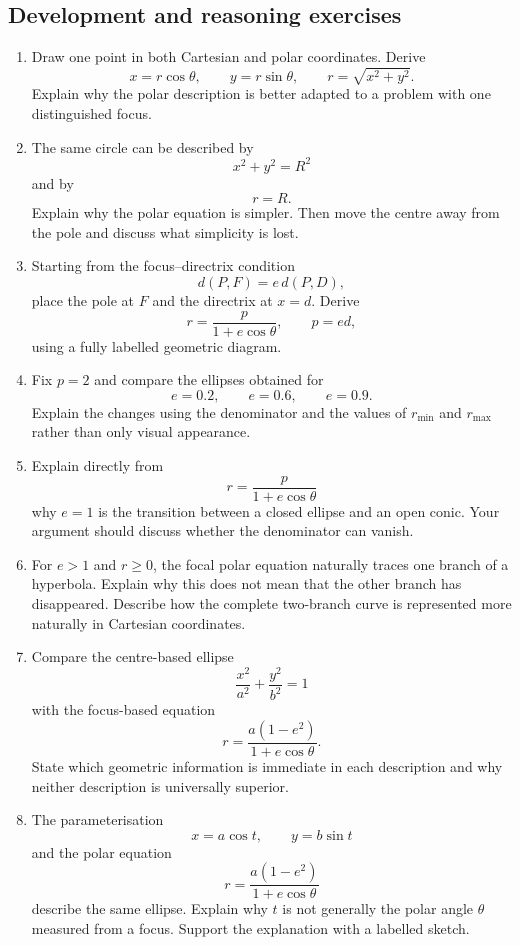 \subsection{Development and reasoning exercises}

\begin{enumerate}

\item Draw one point in both Cartesian and polar coordinates. Derive
\[
x=r\cos\theta,
\qquad
y=r\sin\theta,
\qquad
r=\sqrt{x^2+y^2}.
\]
Explain why the polar description is better adapted to a problem with one
distinguished focus.

\item The same circle can be described by
\[
x^2+y^2=R^2
\]
and by
\[
r=R.
\]
Explain why the polar equation is simpler. Then move the centre away from the
pole and discuss what simplicity is lost.

\item Starting from the focus--directrix condition
\[
d(P,F)=e\,d(P,D),
\]
place the pole at $F$ and the directrix at $x=d$. Derive
\[
r=\frac{p}{1+e\cos\theta},
\qquad p=ed,
\]
using a fully labelled geometric diagram.

\item Fix $p=2$ and compare the ellipses obtained for
\[
e=0.2,\qquad e=0.6,\qquad e=0.9.
\]
Explain the changes using the denominator and the values of $r_{\min}$ and
$r_{\max}$ rather than only visual appearance.

\item Explain directly from
\[
r=\frac{p}{1+e\cos\theta}
\]
why $e=1$ is the transition between a closed ellipse and an open conic. Your
argument should discuss whether the denominator can vanish.

\item For $e>1$ and $r\geq0$, the focal polar equation naturally traces one
branch of a hyperbola. Explain why this does not mean that the other branch has
disappeared. Describe how the complete two-branch curve is represented more
naturally in Cartesian coordinates.

\item Compare the centre-based ellipse
\[
\frac{x^2}{a^2}+\frac{y^2}{b^2}=1
\]
with the focus-based equation
\[
r=\frac{a(1-e^2)}{1+e\cos\theta}.
\]
State which geometric information is immediate in each description and why
neither description is universally superior.

\item The parameterisation
\[
x=a\cos t,
\qquad y=b\sin t
\]
and the polar equation
\[
r=\frac{a(1-e^2)}{1+e\cos\theta}
\]
describe the same ellipse. Explain why $t$ is not generally the polar angle
$\theta$ measured from a focus. Support the explanation with a labelled
sketch.


\end{enumerate}
